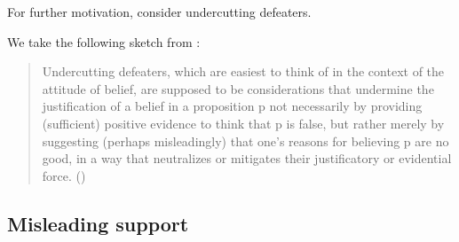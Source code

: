 \begin{note}
  For further motivation, consider undercutting defeaters.

  We take the following sketch from \textcite{Worsnip:2018aa}:
  \begin{quote}
    Undercutting defeaters, which are easiest to think of in the context of the attitude of belief, are supposed to be considerations that undermine the justification of a belief in a proposition p not necessarily by providing (sufficient) positive evidence to think that p is false, but rather merely by suggesting (perhaps misleadingly) that one’s reasons for believing p are no good, in a way that neutralizes or mitigates their justificatory or evidential force.\nolinebreak
    \mbox{}\hfill\mbox{(\citeyear[29]{Worsnip:2018aa})}
  \end{quote}
\end{note}


\subsection{Misleading support}
\label{sec:misleading-support}

